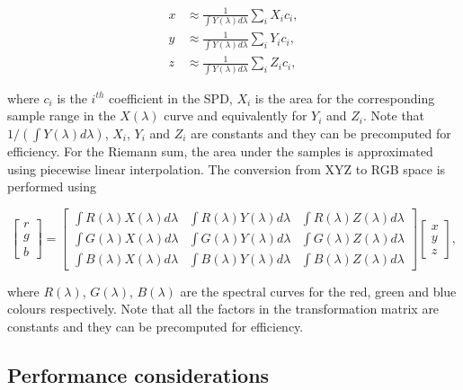 \begin{equation}
\begin{split}
x &\approx \frac{1}{\int Y(\lambda) d\lambda} \sum_i X_i c_i, \\
y &\approx \frac{1}{\int Y(\lambda) d\lambda} \sum_i Y_i c_i, \\
z &\approx \frac{1}{\int Y(\lambda) d\lambda} \sum_i Z_i c_i,
\end{split}
\end{equation}

where $c_i$ is the $i^{th}$ coefficient in the SPD, $X_i$ is the area for the corresponding sample range in the $X(\lambda)$ curve and equivalently for $Y_i$ and $Z_i$.
Note that $1 / \left(\int Y(\lambda) d\lambda \right)$, $X_i$, $Y_i$ and $Z_i$ are constants and they can be precomputed for efficiency.
For the Riemann sum, the area under the samples is approximated using piecewise linear interpolation.
The conversion from XYZ to RGB space is performed using

\begin{equation}
\begin{bmatrix}
r \\
g \\
b
\end{bmatrix}
 = 
\begin{bmatrix}
\int R(\lambda) X(\lambda) d\lambda & \int R(\lambda) Y(\lambda) d\lambda & \int R(\lambda) Z(\lambda) d\lambda \\
\int G(\lambda) X(\lambda) d\lambda & \int G(\lambda) Y(\lambda) d\lambda & \int G(\lambda) Z(\lambda) d\lambda \\
\int B(\lambda) X(\lambda) d\lambda & \int B(\lambda) Y(\lambda) d\lambda & \int B(\lambda) Z(\lambda) d\lambda
\end{bmatrix}
\begin{bmatrix}
x \\
y \\
z
\end{bmatrix},
\end{equation}

where $R(\lambda)$, $G(\lambda)$, $B(\lambda)$ are the spectral curves for the red, green and blue colours respectively.
Note that all the factors in the transformation matrix are constants and they can be precomputed for efficiency.

\subsection{Performance considerations}
\label{sec:performance_considerations}

